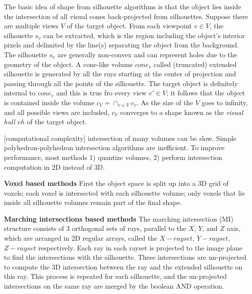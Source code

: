 The basic idea of shape from silhouette algorithms is that the object lies inside the intersection of all visual cones back-projected from silhouettes. Suppose there are multiple views $V$ of the target object. From each viewpoint $v\in V$, the silhouette $s_v$ can be extracted, which is the region including the object's interior pixels and delimited by the line(s) separating the object from the background. The silhouette $s_v$ are generally non-convex and can represent holes due to the geometry of the object. A cone-like volume $cone_v$ called (truncated) extended silhouette is generated by all the rays starting at the center of projection and passing through all the points of the silhouette. The target object is definitely internal to $cone_v$ and this is true fro every view $v'\in V$; it follows that the object is contained inside the volume $c_V=\cap_{v\in V}c_v$. As the size of the $V$ goes to infinity, and all possible views are included, $c_V$ converges to a shape known as the \textit{visual hull} $vh$ of the target object.


[computational complexity] intersection of many volumes can be slow. Simple polyhedron-polyhedron intersection algorithms are inefficient. To improve performance, most methods 1) quantize volumes, 2) perform intersection computation in 2D instead of 3D.

\textbf {Voxel based methods} 
First the object space is split up into a 3D grid of voxels; each voxel is intersected with each silhouette volume; only voxels that lie inside all silhouette volumes remain part of the final shape.

\textbf{Marching intersections based methods} 
The marching intersection (MI) structure consists of 3 orthogonal sets of rays, parallel to the $X$, $Y$, and $Z$ axis, which are arranged in 2D regular arrays, called the $X-rayset$, $Y-rayset$, $Z-rayset$ respectively. Each ray in each rayset is projected to the image plane to find the intersections with the silhouette. These intersections are un-projected to compute the 3D intersection between the ray and the extended silhouette on this ray. This process is repeated for each silhouette, and the un-projected intersections on the same ray are merged by the boolean AND operation.

